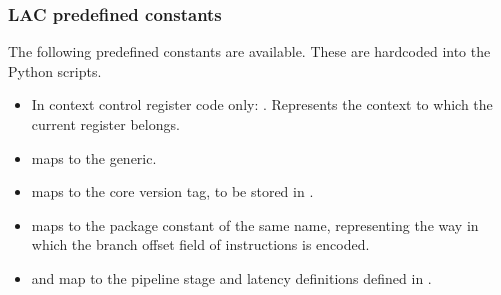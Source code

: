 
\subsubsection{LAC predefined constants}
\label{sec:core-ug-cfg-cregs-predef}

The following predefined constants are available. These are hardcoded into the
Python scripts.

\begin{itemize}

\item In context control register code only: . Represents the
context to which the current register belongs.

\item {} maps to the  generic.

\item {} maps to the core version tag, to be stored
in .

\item {} maps to the package constant of the same
name, representing the way in which the branch offset field of instructions is
encoded.

\item {} and  map to the pipeline stage and
latency definitions defined in .

\end{itemize}


